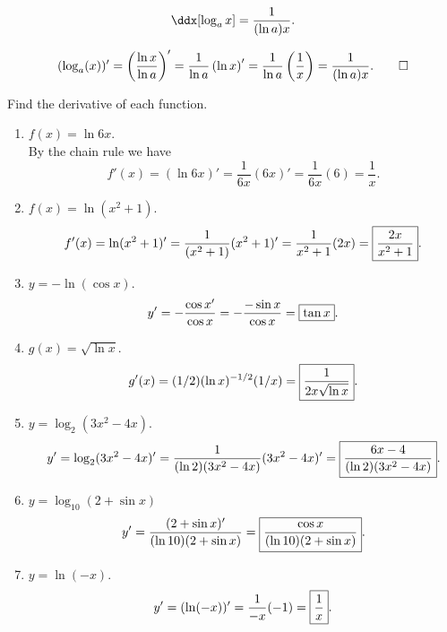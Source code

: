\documentclass{book}
\begin{document}
 \begin{Thm} \[\ddx[\log_a x] = \dfrac{1}{(\ln a)x}.\]\end{Thm}
\begin{pf}\mbox{}\vspace{-30pt}

\[(\log_a(x))' = \left(\dfrac{\ln x}{\ln a}\right)' = \dfrac{1}{\ln a}\left(\ln x\right)' = \dfrac{1}{\ln a}\left(\dfrac{1}{x}\right) = \dfrac{1}{(\ln a)x}.\qedhere\]
\end{pf}\vs

\begin{Exam}\label{exam:log} Find the derivative of each function.
\begin{enumerate}[label={(\alph*)}]
\item $f(x) = \ln 6x$.\\
By the chain rule we have \[f'(x) = (\ln 6x)' = \dfrac{1}{6x}(6x)' = \dfrac{1}{6x}(6) = \dfrac{1}{x}.\]



\item $f(x) = \ln(x^2+1)$.
\[f'(x) = \ln(x^2+1)' = \dfrac{1}{(x^2+1)}(x^2+1)' = \dfrac{1}{x^2+1}(2x) = \fbox{$\dfrac{2x}{x^2+1}$}.\]

\item $y = -\ln(\cos x)$.
\[y' = -\dfrac{\cos x '}{\cos x} = -\dfrac{-\sin x}{\cos x} = \fbox{$\tan x$}.\]

\item $g(x) = \sqrt{\ln x}$.
\[g'(x) = (1/2)(\ln x)^{-1/2}(1/x) = \fbox{$\dfrac{1}{2x\sqrt{\ln x}}$}.\]

\item $y = \log_2(3x^2-4x)$.
\[y' = \log_2(3x^2-4x)' = \dfrac{1}{(\ln 2)(3x^2-4x)}(3x^2-4x)' = \fbox{$\dfrac{6x-4}{(\ln 2)(3x^2-4x)}$}.\]

\item $y = \log_{10}(2+\sin x)$
\[y' = \dfrac{(2+\sin x)'}{(\ln 10)(2 + \sin x)} = \fbox{$\dfrac{\cos x}{(\ln 10)(2+ \sin x)}$}.\]

\item\label{item:ab} $y = \ln (-x)$.
\[y' = (\ln(-x))' = \dfrac{1}{-x}(-1) = \fbox{$\dfrac{1}{x}$}.\]
\end{enumerate}
\end{Exam}\vs
\end{document}
